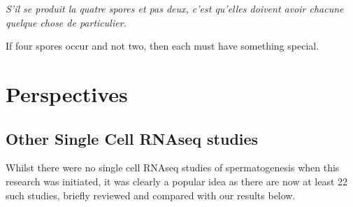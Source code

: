 \begin{savequote}[8cm]
\textit{S'il se produit la quatre spores et pas deux, c'est qu'elles doivent avoir chacune quelque chose de particulier.}

If four spores occur and not two, then each must have something special.
\end{savequote}

\chapter{\label{ch:4-discuss}Perspectives}

\minitoc


\section{Other Single Cell RNAseq studies}
Whilst there were no single cell RNAseq studies of spermatogenesis when this research was initiated, it was clearly a popular idea as there are now at least 22 such studies, briefly reviewed and compared with our results below.


